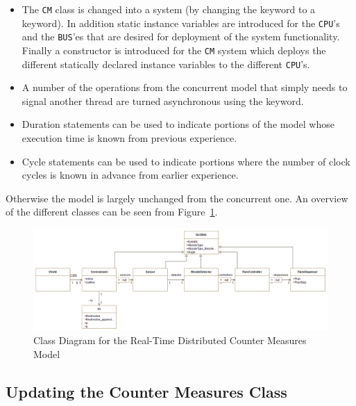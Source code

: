\documentclass{overturerepchap}
\begin{document}
\begin{itemize}
\item The \texttt{CM} class is changed into a system (by changing the
{\bf{}} keyword to a {\bf{}} keyword). In addition
static instance variables are introduced for the \texttt{CPU}'s and the
\texttt{BUS}'es that are desired for deployment of the system functionality.
Finally a constructor is introduced for the \texttt{CM} system which deploys
the different statically declared instance variables to the different 
\texttt{CPU}'s.
\item A number of the operations from the concurrent model that simply
  needs to signal another thread are turned asynchronous using the
  {\bf{}} keyword.
\item Duration statements can be used to indicate portions of the model
whose execution time is known from previous experience.
\item Cycle statements can be used to indicate portions where the number 
of clock cycles is known in advance from earlier experience.
\end{itemize}

Otherwise the model is largely unchanged from the concurrent one. An
overview of the different classes can be seen from
Figure~\ref{fig:classdiagvice}.

\begin{figure}
\begin{center}
\includegraphics[width=6in]{figures/viceCMclassdiag.png}
\end{center}
\caption{Class Diagram for the Real-Time Distributed Counter Measures Model\label{fig:classdiagvice}}
\end{figure}

\subsection{Updating the Counter Measures Class}
\end{document}
